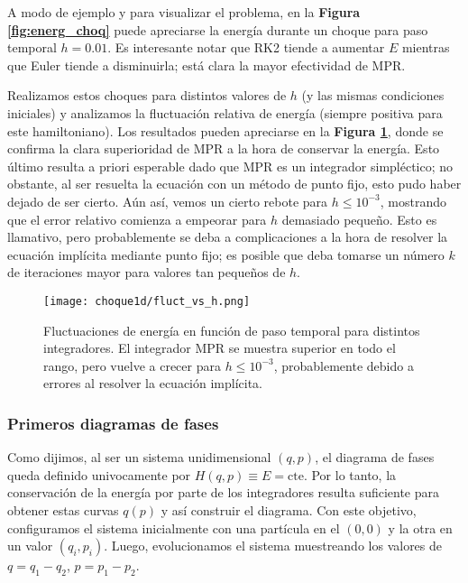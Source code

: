 A modo de ejemplo y para visualizar el problema, en la \textbf{Figura \ref{fig:energ_choq}} puede apreciarse la energía durante un choque para paso temporal $h=0.01$.
Es interesante notar que RK2 tiende a aumentar $E$ mientras que Euler tiende a disminuirla; está clara la mayor efectividad de MPR.

Realizamos estos choques para distintos valores de $h$ (y las mismas condiciones iniciales) y analizamos la fluctuación relativa de energía (siempre positiva para este hamiltoniano).
Los resultados pueden apreciarse en la \textbf{Figura \ref{fig:flucvsh}}, donde se confirma la clara superioridad de MPR a la hora de conservar la energía.
Esto último resulta a priori esperable dado que MPR es un integrador simpléctico; no obstante, al ser resuelta la ecuación con un método de punto fijo, esto pudo haber dejado de ser cierto.
Aún así, vemos un cierto rebote para $h\leq10^{-3}$, mostrando que el error relativo comienza a empeorar para $h$ demasiado pequeño.
Esto es llamativo, pero probablemente se deba a complicaciones a la hora de resolver la ecuación implícita mediante punto fijo; es posible que deba tomarse un número $k$ de iteraciones mayor
para valores tan pequeños de $h$.

\begin{figure}[H]
	\centering
	\texttt{[image: choque1d/fluct\_vs\_h.png]}
	\caption{Fluctuaciones de energía en función de paso temporal para distintos integradores.
	El integrador MPR se muestra superior en todo el rango, pero vuelve a crecer para $h\leq10^{-3}$, probablemente debido a errores al resolver la ecuación implícita.}
	\label{fig:flucvsh}
\end{figure}

\subsubsection{Primeros diagramas de fases}

Como dijimos, al ser un sistema unidimensional $(q,p)$, el diagrama de fases queda definido univocamente por $H(q,p)\equiv E = \text{cte}$.
Por lo tanto, la conservación de la energía por parte de los integradores resulta suficiente para obtener estas curvas $q(p)$ y así construir el diagrama.
Con este objetivo, configuramos el sistema inicialmente con una partícula en el $(0,0)$ y la otra en un valor $(q_i, p_i)$.
Luego, evolucionamos el sistema muestreando los valores de $q = q_1 - q_2$, $p = p_1 - p_2$.

